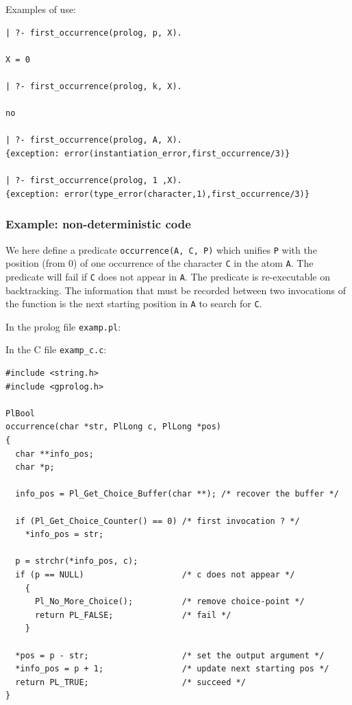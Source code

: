 
Examples of use:

\begin{Code}
\begin{verbatim}
| ?- first_occurrence(prolog, p, X).

X = 0

| ?- first_occurrence(prolog, k, X).

no

| ?- first_occurrence(prolog, A, X).
{exception: error(instantiation_error,first_occurrence/3)}

| ?- first_occurrence(prolog, 1 ,X).
{exception: error(type_error(character,1),first_occurrence/3)}
\end{verbatim}
\end{Code}

\subsubsection{Example: non-deterministic code}
We here define a predicate \texttt{occurrence(A, C, P)} which unifies
\texttt{P} with the position (from 0) of one occurrence of the character
\texttt{C} in the atom \texttt{A}. The predicate will fail if \texttt{C}
does not appear in \texttt{A}. The predicate is re-executable on
backtracking. The information that must be recorded between two invocations
of the function is the next starting position in \texttt{A} to search for
\texttt{C}.

In the prolog file \texttt{examp.pl}:


In the C file \texttt{examp\_c.c}:

\begin{Code}
\begin{verbatim}
#include <string.h>
#include <gprolog.h>

PlBool
occurrence(char *str, PlLong c, PlLong *pos)
{
  char **info_pos;
  char *p;

  info_pos = Pl_Get_Choice_Buffer(char **); /* recover the buffer */

  if (Pl_Get_Choice_Counter() == 0) /* first invocation ? */
    *info_pos = str;

  p = strchr(*info_pos, c);
  if (p == NULL)                    /* c does not appear */
    {
      Pl_No_More_Choice();          /* remove choice-point */
      return PL_FALSE;              /* fail */
    }

  *pos = p - str;                   /* set the output argument */
  *info_pos = p + 1;                /* update next starting pos */
  return PL_TRUE;                   /* succeed */
}
\end{verbatim}
\end{Code}

